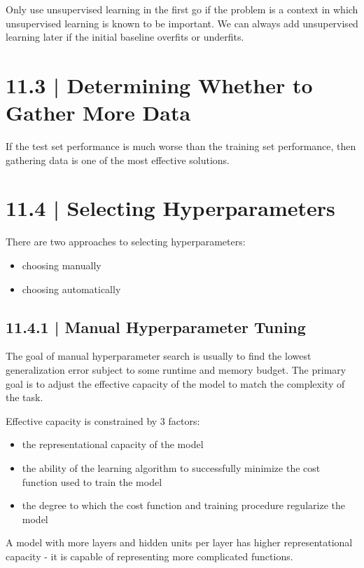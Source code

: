 \documentclass[letterpaper, 12pt]{report}
\begin{document}
Only use unsupervised learning in the first go if the problem is a context in which unsupervised learning is known to be important. We can always add unsupervised learning later if the initial baseline overfits or underfits. 

\section{11.3 | Determining Whether to Gather More Data }

If the test set performance is much worse than the training set performance, then gathering data is one of the most effective solutions. 

\section{11.4 | Selecting Hyperparameters}

There are two approaches to selecting hyperparameters: 

\begin{itemize}
\item choosing manually 
\item choosing automatically
\end{itemize}

\subsection{11.4.1 | Manual Hyperparameter Tuning}

The goal of manual hyperparameter search is usually to find the lowest generalization error subject to some runtime and memory budget. The primary goal is to adjust the effective capacity of the model to match the complexity of the task. 

Effective capacity is constrained by 3 factors: 

\begin{itemize}
\item the representational capacity of the model 
\item the ability of the learning algorithm to successfully minimize the cost function used to train the model 
\item the degree to which the cost function and training procedure regularize the model
\end{itemize}

A model with more layers and hidden units per layer has higher representational capacity - it is capable of representing more complicated functions. 
\end{document}
